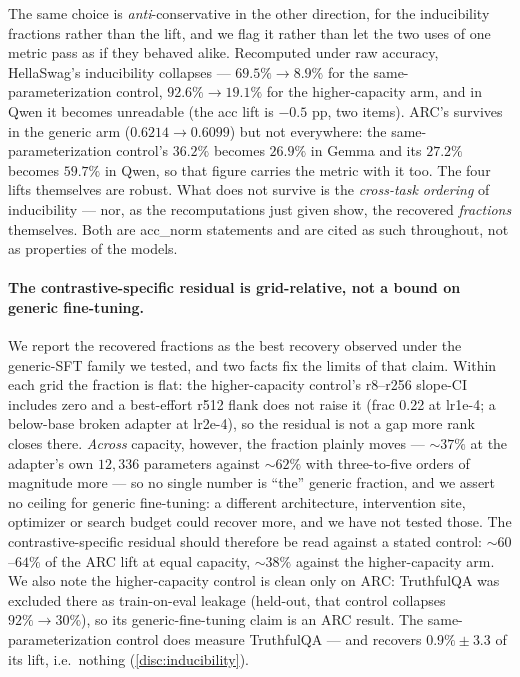 The same choice is \emph{anti}-conservative in the other direction, for the
inducibility fractions rather than the lift, and we flag it rather than let the two
uses of one metric pass as if they behaved alike. Recomputed under raw accuracy,
HellaSwag's inducibility collapses --- $69.5\% \rightarrow 8.9\%$ for the
same-parameterization control, $92.6\% \rightarrow 19.1\%$ for the higher-capacity
arm, and in Qwen it becomes unreadable (the acc lift is $-0.5$ pp, two items). ARC's
survives in the generic arm ($0.6214 \rightarrow 0.6099$) but not everywhere: the
same-parameterization control's $36.2\%$ becomes $26.9\%$ in Gemma and its $27.2\%$
becomes $59.7\%$ in Qwen, so that figure carries the metric with it too. The four
lifts themselves are robust. What does not survive is the \emph{cross-task ordering}
of inducibility --- nor, as the recomputations just given show, the recovered
\emph{fractions} themselves. Both are acc\_norm statements and are cited as such
throughout, not as properties of the models.

\paragraph{The contrastive-specific residual is grid-relative, not a bound on generic
fine-tuning.}
We report the recovered fractions as the best recovery observed under the
generic-SFT family we tested, and two facts fix the limits of that claim. Within each
grid the fraction is flat: the higher-capacity control's r8--r256 slope-CI includes
zero and a best-effort r512 flank does not raise it (frac 0.22 at lr1e-4; a below-base
broken adapter at lr2e-4), so the residual is not a gap more rank closes there.
\emph{Across} capacity, however, the fraction plainly moves --- ${\sim}37\%$ at the
adapter's own $12{,}336$ parameters against ${\sim}62\%$ with three-to-five orders of
magnitude more --- so no single number is ``the'' generic fraction, and we assert no
ceiling for generic fine-tuning: a different architecture, intervention site,
optimizer or search budget could recover more, and we have not tested those. The
contrastive-specific residual should therefore be read against a stated control:
${\sim}60$--$64\%$ of the ARC lift at equal capacity, ${\sim}38\%$ against the
higher-capacity arm. We also note the higher-capacity control is clean only on ARC:
TruthfulQA was excluded there as train-on-eval leakage (held-out, that control
collapses $92\%{\rightarrow}30\%$), so its generic-fine-tuning claim is an ARC result.
The same-parameterization control does measure TruthfulQA --- and recovers
$0.9\% \pm 3.3$ of its lift, i.e.\ nothing (\cref{disc:inducibility}).

